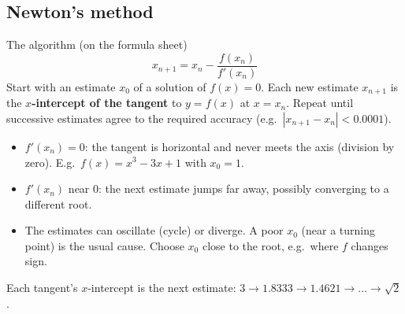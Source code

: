 \subsection{Newton's method \newsd}
\label{sec:newton}

\begin{cols}[0.53]
\begin{keyres}{The algorithm (on the formula sheet)}
\[x_{n+1}=x_n-\frac{f(x_n)}{f'(x_n)}\]
Start with an estimate $x_0$ of a solution of $f(x)=0$. Each new estimate $x_{n+1}$ is the \textbf{$x$-intercept of the tangent} to $y=f(x)$ at $x=x_n$. Repeat until successive estimates agree to the required accuracy (e.g.\ $|x_{n+1}-x_n|<0.0001$).
\end{keyres}
\begin{warn}
\begin{itemize}
  \item $f'(x_n)=0$: the tangent is horizontal and never meets the axis (division by zero). E.g.\ $f(x)=x^3-3x+1$ with $x_0=1$.
  \item $f'(x_n)$ near $0$: the next estimate jumps far away, possibly converging to a different root.
  \item The estimates can oscillate (cycle) or diverge. A poor $x_0$ (near a turning point) is the usual cause. Choose $x_0$ close to the root, e.g.\ where $f$ changes sign.
\end{itemize}
\end{warn}
\nextcol[0.445]
\centering
{}

{\scriptsize Each tangent's $x$-intercept is the next estimate: $3\to1.8333\to1.4621\to\dots\to\sqrt2$.}
\end{cols}

